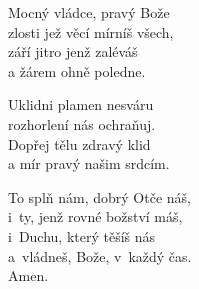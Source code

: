 \begin{translatioMulticol}{3}
Mocný vládce, pravý Bože\\
zlosti jež věcí mírníš všech,\\
září jitro jenž zaléváš\\
a žárem ohně poledne.\columnbreak

Uklidni plamen nesváru\\
rozhorlení nás ochraňuj.\\
Dopřej tělu zdravý klid\\
a mír pravý našim srdcím.\columnbreak

To splň nám, dobrý Otče náš,\\
i~ty, jenž rovné božství máš,\\
i~Duchu, který těšíš nás\\
a~vládneš, Bože, v~každý čas.\\
Amen.
\end{translatioMulticol}
